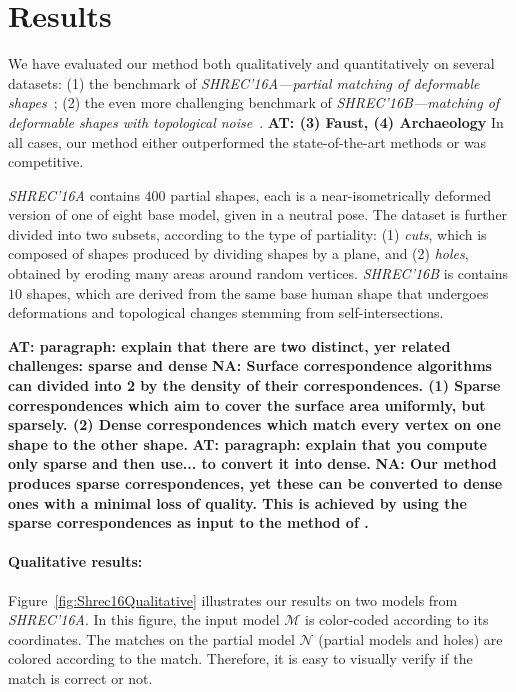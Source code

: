 \documentclass[10pt,twocolumn,letterpaper]{article}
\newcommand{\colornote}[3]{{\color{#1}\bf{#2: #3}\normalfont}}
\newcommand{\colornote}[3]{}
\newcommand {\ayellet}[1]{\colornote{blue}{AT}{#1}}
\newcommand {\nadav}[1]{\colornote{red}{NA}{#1}}
\begin{document}
\section{Results}
\label{section:results}

We have evaluated our method both qualitatively and quantitatively on several datasets:
(1) the benchmark of {\em SHREC'16A---partial matching of deformable shapes}~\cite{cosmo2016shrec};
(2) the even more challenging benchmark of {\em SHREC’16B---matching of deformable shapes with topological noise}~\cite{lahner2016shrec}.
\ayellet{(3) Faust, (4) Archaeology}
In all cases, our method either outperformed the state-of-the-art methods or was competitive.

{\em SHREC'16A} contains $400$ partial shapes, each is a near-isometrically deformed version of one of eight base model, given in a neutral pose.
The dataset is further divided into two subsets, according to the type of partiality:
(1) \textit{cuts}, which is composed of shapes produced by dividing shapes by a plane, and (2) \textit{holes}, obtained by eroding many areas around random vertices. 
{\em SHREC’16B} is contains $10$ shapes, which are
derived from the same base human shape that undergoes deformations and topological changes stemming from self-intersections. 

\ayellet{paragraph: explain that there are two distinct, yer related challenges: sparse and dense}
\nadav{Surface correspondence algorithms can divided into 2 by the density of their correspondences. 
	(1) Sparse correspondences which aim to cover the surface area uniformly, but sparsely.
	(2) Dense correspondences which match every vertex on one shape to the other shape.}
\ayellet{paragraph: explain that you compute only sparse and then use... to convert it into dense.}
 \nadav{ Our method produces sparse correspondences, yet these can be converted to dense ones with a minimal loss of quality.
 This is achieved by using the sparse correspondences as input to the method of \cite{litany2017fully}.}
\paragraph{Qualitative results:} 
Figure~\ref{fig:Shrec16Qualitative} illustrates our results on two models from {\em SHREC'16A}.
In this figure, the input model $\mathcal{M}$ is color-coded according to its coordinates.
The matches on the partial model $\mathcal{N}$ (partial models and holes) are colored according to the match.
Therefore, it is easy to visually verify if the match is correct or not.
\end{document}

